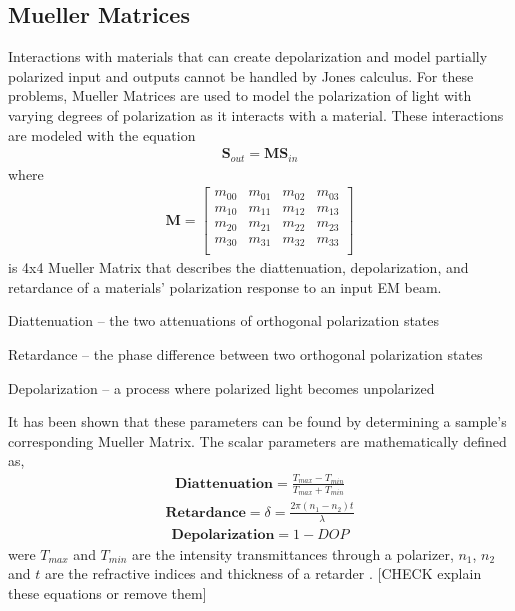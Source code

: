 \subsection{Mueller Matrices}
Interactions with materials that can create depolarization and model partially polarized input and outputs cannot be handled by Jones calculus.  For these problems, Mueller Matrices are used to model the polarization of light with varying degrees of polarization as it interacts with a material.  These interactions are modeled with the equation
\begin{align}
    \mathbf{S}_{out} = \mathbf{M}\mathbf{S}_{in}
\end{align}
%
where
%
\begin{align}
    \mathbf{M} =
    \begin{bmatrix}
        m_{00} & m_{01} & m_{02} & m_{03} \\
        m_{10} & m_{11} & m_{12} & m_{13} \\
        m_{20} & m_{21} & m_{22} & m_{23} \\
        m_{30} & m_{31} & m_{32} & m_{33} \\
    \end{bmatrix}
\end{align}
%
is 4x4 Mueller Matrix that describes the diattenuation, depolarization, and retardance of a materials' polarization response to an input EM beam.

Diattenuation – the two attenuations of orthogonal polarization states \cite{chipman}

Retardance – the phase difference between two orthogonal polarization states \cite{giakos}

Depolarization – a process where polarized light becomes unpolarized \cite{giakos}

It has been shown that these parameters can be found by determining a sample's corresponding Mueller Matrix. The scalar parameters are mathematically defined as,
\begin{align}
    \mathbf{Diattenuation} = \frac{T_{max} - T_{min}}{T_{max} + T_{min}}
\end{align}
\begin{align}
    \mathbf{Retardance} = \delta = \frac{2\pi(n_1 - n_2)t}{\lambda}
\end{align}
\begin{align}
    \mathbf{Depolarization} = 1 - DOP
\end{align}
were $T_{max}$ and $T_{min}$ are the intensity transmittances through a polarizer, $n_1$, $n_2$ and $t$ are the refractive indices and thickness of a retarder \cite{chipman}.
[CHECK explain these equations or remove them]

